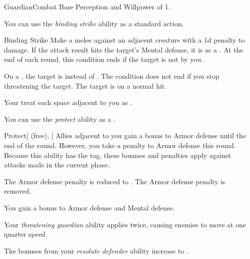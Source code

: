     \begin{feat}{Guardian}{Combat}
        \featpre Base Perception and Willpower of 1.

         You can use the \textit{binding strike} ability as a standard action.
        \begin{freeability}{Binding Strike}
            Make a melee  against an adjacent creature with a \minus1d penalty to damage.
            If the attack result hits the target's Mental defense,
                it is  as a .
                At the end of each round, this condition ends if the target is not  by you.

            \rankline
             On a , the target is  instead of .
             The condition does not end if you stop threatening the target.
             The target is  on a normal hit.
        \end{freeability}

         Your  treat each space adjacent to you as .

         You can use the \textit{protect} ability as a .
        \begin{freeability}{Protect}[ (free), ]
            Allies adjacent to you gain a  bonus to Armor defense until the end of the round.
            However, you take a  penalty to Armor defense this round.
            Because this ability has the  tag, these bonuses and penalties apply against attacks made in the current phase.

            \rankline
             The Armor defense penalty is reduced to .
             The Armor defense penalty is removed.
        \end{freeability}

         You gain a  bonus to Armor defense and Mental defense.

         Your \textit{threatening guardian} ability applies  twice, causing enemies to move at one quarter speed.

         The bonuses from your \textit{resolute defender} ability increase to .
    \end{feat}

